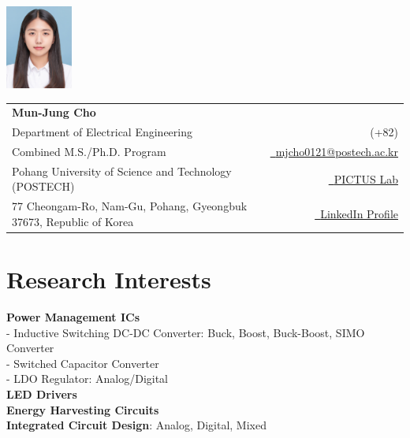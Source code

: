 \documentclass[a4paper,11pt]{article}
\makeatletter
\newcommand{\name}{Mun-Jung Cho} %
\newcommand{\course}{Combined M.S./Ph.D. Program} %
\newcommand{\phone}{(+82) } %
\newcommand{\emaila}{mjcho0121@postech.ac.kr} %
\makeatother
\begin{document}
\selectfont


\parbox{2.35cm}{%
\vspace{3.2mm} %
\includegraphics[width=2.2cm,clip]{증명사진.jpg}
}
\parbox{\dimexpr\linewidth-2.8cm\relax}{
\begin{tabularx}{\linewidth}{L r} \\
  \textbf{\Large \name} & {}\\
  {Department of Electrical Engineering} & {\raisebox{0.0\height}{\footnotesize \faPhone}\ \phone}\\
  \course &  \href{mailto:\emaila}{\raisebox{0.0\height}{\footnotesize \faEnvelope}\ {\emaila}} \\
  {Pohang University of Science and Technology (POSTECH)} &  \href{https://sites.google.com/view/pictuslab}{\raisebox{0.0\height}{\footnotesize \faGlobe}\ {PICTUS Lab}} \\
  {77 Cheongam-Ro, Nam-Gu, Pohang, Gyeongbuk 37673, Republic of Korea} & \href{https://www.linkedin.com/in/mun-jung-cho-a92898301}{\raisebox{0.0\height}{\footnotesize \faLinkedin}\ {LinkedIn Profile}}
\end{tabularx}
}

\section{\textbf{Research Interests}}
 \begin{itemize}[leftmargin=0.05in, label={}]
    \small{\item{
     \textbf{Power Management ICs} \\
        \hspace{0.05in} - Inductive Switching DC-DC Converter: Buck, Boost, Buck-Boost, SIMO Converter \\
        \hspace{0.05in} - Switched Capacitor Converter \\
        \hspace{0.05in} - LDO Regulator: Analog/Digital \\
     \textbf{LED Drivers} \\
     \textbf{Energy Harvesting Circuits} \\
     \textbf{Integrated Circuit Design}{: Analog, Digital, Mixed} \\
    }}
 \end{itemize}
 \vspace{-16pt}
\end{document}
